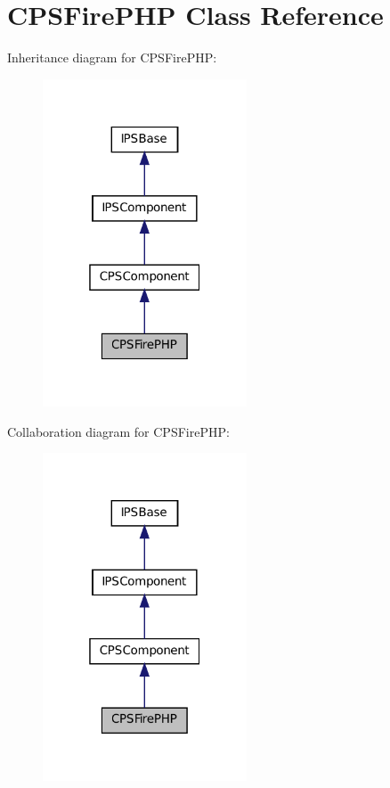 \hypertarget{classCPSFirePHP}{
\section{CPSFirePHP Class Reference}
\label{classCPSFirePHP}
}


Inheritance diagram for CPSFirePHP:\nopagebreak
\begin{figure}[H]
\begin{center}
\leavevmode
\includegraphics[width=172pt]{classCPSFirePHP__inherit__graph}
\end{center}
\end{figure}


Collaboration diagram for CPSFirePHP:\nopagebreak
\begin{figure}[H]
\begin{center}
\leavevmode
\includegraphics[width=172pt]{classCPSFirePHP__coll__graph}
\end{center}
\end{figure}

